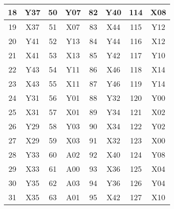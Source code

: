 {\begin{tabular}{|c|c|c|c|c|c|c|c|}
  18     & Y37    & 50     & Y07    & 82     & Y40    & 114    & X08    \\ \hline
  19     & X37    & 51     & X07    & 83     & X44    & 115    & Y12    \\ \hline
  20     & Y41    & 52     & Y13    & 84     & Y44    & 116    & X12    \\ \hline
  21     & X41    & 53     & X13    & 85     & Y42    & 117    & Y10    \\ \hline
  22     & Y43    & 54     & Y11    & 86     & X46    & 118    & X14    \\ \hline
  23     & X43    & 55     & X11    & 87     & Y46    & 119    & Y14    \\ \hline
  24     & Y31    & 56     & Y01    & 88     & Y32    & 120    & Y00    \\ \hline
  25     & X31    & 57     & X01    & 89     & Y34    & 121    & X02    \\ \hline
  26     & Y29    & 58     & Y03    & 90     & X34    & 122    & Y02    \\ \hline
  27     & X29    & 59     & X03    & 91     & X32    & 123    & X00    \\ \hline
  28     & Y33    & 60     & A02    & 92     & X40    & 124    & Y08    \\ \hline
  29     & X33    & 61     & A00    & 93     & X36    & 125    & X04    \\ \hline
  30     & Y35    & 62     & A03    & 94     & Y36    & 126    & Y04    \\ \hline
  31     & X35    & 63     & A01    & 95     & X42    & 127    & X10    \\ \hline
  
  \end{tabular}
}

